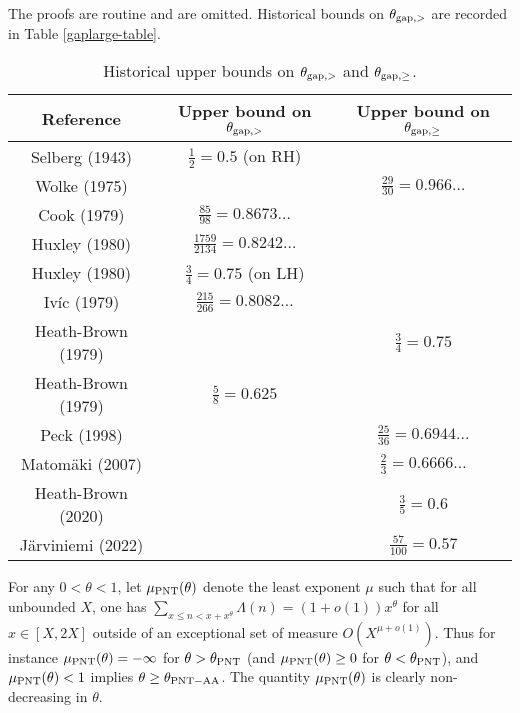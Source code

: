 The proofs are routine and are omitted.  Historical bounds on $\theta_{\mathrm{gap},>}$ are recorded in Table \ref{gaplarge-table}.

\begin{table}[ht]
    \caption{Historical upper bounds on $\theta_{\mathrm{gap},>}$ and $\theta_{\mathrm{gap},\geq}$.}
    \centering
    \renewcommand{\arraystretch}{1.2}
    \begin{tabular}{|c|c|c|}
    \hline
    Reference & Upper bound on $\theta_{\mathrm{gap},>}$ & Upper bound on $\theta_{\mathrm{gap},\geq}$\\
    \hline
    Selberg (1943) \cite{selberg_1943} & $\frac{1}{2}=0.5$ (on RH) & \\
    \hline
    Wolke (1975) \cite{wolke_1975} & & $\frac{29}{30} = 0.966\dots$ \\
    \hline
    Cook (1979) \cite{cook_1979} & $\frac{85}{98} = 0.8673\dots$ & \\
    \hline
    Huxley (1980) \cite{huxley_large_1980} & $\frac{1759}{2134} = 0.8242\dots$ & \\
    \hline
    Huxley (1980) \cite{huxley_large_1980} & $\frac{3}{4} = 0.75$ (on LH) & \\
    \hline
    Iv\'ic (1979) \cite{ivic_sums_1979} & $\frac{215}{266} = 0.8082\dots$ & \\
    \hline
    Heath-Brown (1979) \cite{heath_brown_consecutive_III} & & $\frac{3}{4} = 0.75$ \\
    \hline
    Heath-Brown (1979) \cite{heath_brown_consecutive_II} & $\frac{5}{8} = 0.625$ & \\
    \hline
    Peck (1998) \cite{peck_differences_1998} & & $\frac{25}{36} = 0.6944\ldots$ \\
    \hline
    Matom\"{a}ki (2007) \cite{matomaki_large_2007} & & $\frac{2}{3} = 0.6666\ldots$ \\
    \hline
    Heath-Brown (2020) \cite{heath-brown_differences_2021} & & $\frac{3}{5} = 0.6$\\
    \hline
    J\"{a}rviniemi (2022) \cite{jarviniemi_large_2022} & & $\frac{57}{100} = 0.57$\\
    \hline
    \end{tabular}
\end{table}\label{gaplarge-table}

For any $0 < \theta < 1$, let $\mu_{\mathrm{PNT}}(\theta)$ denote the least exponent $\mu$ such that for all unbounded $X$, one has $\sum_{x \leq n < x + x^\theta} \Lambda(n) = (1+o(1)) x^\theta$ for all $x \in [X,2X]$ outside of an exceptional set of measure $O(X^{\mu+o(1)})$.  Thus for instance $\mu_{\mathrm{PNT}}(\theta)=-\infty$ for $\theta > \theta_{\mathrm{PNT}}$ (and $\mu_{\mathrm{PNT}}(\theta) \geq 0$ for $\theta < \theta_{\mathrm{PNT}}$), and $\mu_{\mathrm{PNT}}(\theta) < 1$ implies $\theta \geq \theta_{\mathrm{PNT-AA}}$. The quantity $\mu_{\mathrm{PNT}}(\theta)$ is clearly non-decreasing in $\theta$.

